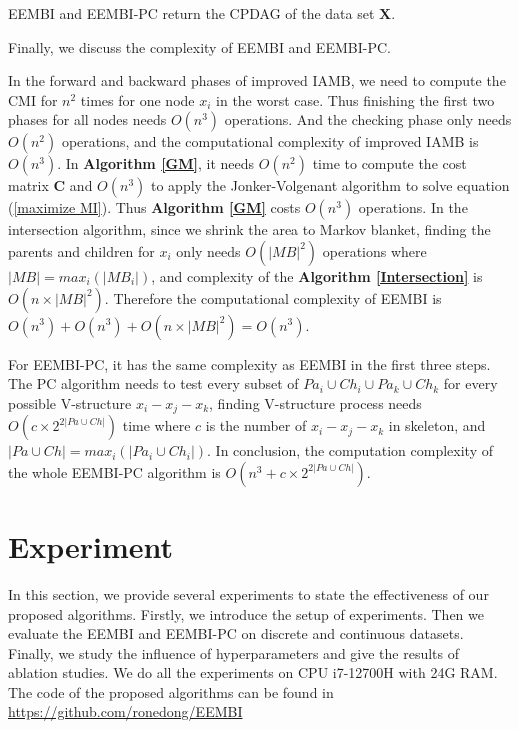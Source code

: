 \documentclass[twoside,11pt]{article}
\begin{document}
\begin{corollary}
EEMBI and EEMBI-PC return the CPDAG of the data set $\mathbf X$.
\end{corollary}

Finally, we discuss the complexity of EEMBI and EEMBI-PC.

In the forward and backward phases of improved IAMB, we need to compute the CMI for $n^2$ times for one node $x_i$ in the worst case. Thus finishing the first two phases for all nodes needs $O(n^3)$ operations. And the checking phase only needs $O(n^2)$ operations, and the computational complexity of improved IAMB is $O(n^3)$. In \textbf{Algorithm \ref{GM}}, it needs $O(n^2)$ time to compute the cost matrix $\mathbf C$ and $O(n^3)$ to apply the Jonker-Volgenant algorithm to solve equation (\ref{maximize MI}). Thus \textbf{Algorithm \ref{GM}} costs $O(n^3)$ operations. In the intersection algorithm, since we shrink the area to Markov blanket, finding the parents and children for $x_i$ only needs $O(|MB|^2)$ operations where $|MB|=max_i(|MB_i|)$, and complexity of the \textbf{Algorithm \ref{Intersection}} is $O(n\times|MB|^2)$. Therefore the computational complexity of EEMBI is $O(n^3)+O(n^3)+O(n\times|MB|^2)=O(n^3)$. 

For EEMBI-PC, it has the same complexity as EEMBI in the first three steps. The PC algorithm needs to test every subset of $Pa_i\cup Ch_i\cup Pa_k\cup Ch_k$ for every possible V-structure $x_i-x_j-x_k$, finding V-structure process needs $O(c\times 2^{2|Pa\cup Ch|})$ time where $c$ is the number of $x_i-x_j-x_k$ in skeleton, and $|Pa\cup Ch|=max_i(|Pa_i\cup Ch_i|)$. In conclusion, the computation complexity of the whole EEMBI-PC algorithm is $O(n^3+c\times 2^{2|Pa\cup Ch|})$.



























\section{Experiment}

In this section, we provide several experiments to state the effectiveness of our proposed algorithms. Firstly, we introduce the setup of experiments. Then we evaluate the EEMBI and EEMBI-PC on discrete and continuous datasets. Finally, we study the influence of hyperparameters and give the results of ablation studies. We do all the experiments on CPU i7-12700H with 24G RAM. The code of the proposed algorithms can be found in \href{https://github.com/ronedong/EEMBI}{https://github.com/ronedong/EEMBI}
\end{document}
